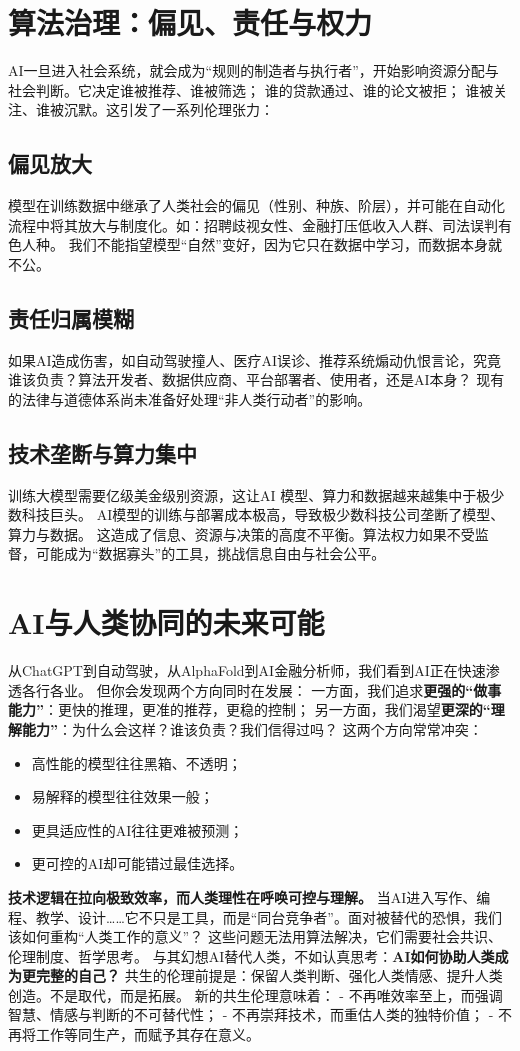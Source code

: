 \section{算法治理：偏见、责任与权力}

AI一旦进入社会系统，就会成为“规则的制造者与执行者”，开始影响资源分配与社会判断。它决定谁被推荐、谁被筛选； 谁的贷款通过、谁的论文被拒； 谁被关注、谁被沉默。这引发了一系列伦理张力：
\subsection*{偏见放大}
模型在训练数据中继承了人类社会的偏见（性别、种族、阶层），并可能在自动化流程中将其放大与制度化。如：招聘歧视女性、金融打压低收入人群、司法误判有色人种。
我们不能指望模型“自然”变好，因为它只在数据中学习，而数据本身就不公。
\subsection*{责任归属模糊}
如果AI造成伤害，如自动驾驶撞人、医疗AI误诊、推荐系统煽动仇恨言论，究竟谁该负责？算法开发者、数据供应商、平台部署者、使用者，还是AI本身？
现有的法律与道德体系尚未准备好处理“非人类行动者”的影响。
\subsection*{技术垄断与算力集中}
训练大模型需要亿级美金级别资源，这让AI 模型、算力和数据越来越集中于极少数科技巨头。
AI模型的训练与部署成本极高，导致极少数科技公司垄断了模型、算力与数据。
这造成了信息、资源与决策的高度不平衡。算法权力如果不受监督，可能成为“数据寡头”的工具，挑战信息自由与社会公平。
\section{AI与人类协同的未来可能}
从ChatGPT到自动驾驶，从AlphaFold到AI金融分析师，我们看到AI正在快速渗透各行各业。
但你会发现两个方向同时在发展： 一方面，我们追求\textbf{更强的“做事能力”}：更快的推理，更准的推荐，更稳的控制；
另一方面，我们渴望\textbf{更深的“理解能力”}：为什么会这样？谁该负责？我们信得过吗？
这两个方向常常冲突：
\begin{itemize}
\item 高性能的模型往往黑箱、不透明；
\item 易解释的模型往往效果一般；
\item 更具适应性的AI往往更难被预测；
\item 更可控的AI却可能错过最佳选择。
\end{itemize}
\textbf{技术逻辑在拉向极致效率，而人类理性在呼唤可控与理解。}
当AI进入写作、编程、教学、设计……它不只是工具，而是“同台竞争者”。面对被替代的恐惧，我们该如何重构“人类工作的意义”？
这些问题无法用算法解决，它们需要社会共识、伦理制度、哲学思考。
与其幻想AI替代人类，不如认真思考：\textbf{AI如何协助人类成为更完整的自己？}
共生的伦理前提是：保留人类判断、强化人类情感、提升人类创造。不是取代，而是拓展。
新的共生伦理意味着：
- 不再唯效率至上，而强调智慧、情感与判断的不可替代性；
- 不再崇拜技术，而重估人类的独特价值；
- 不再将工作等同生产，而赋予其存在意义。
